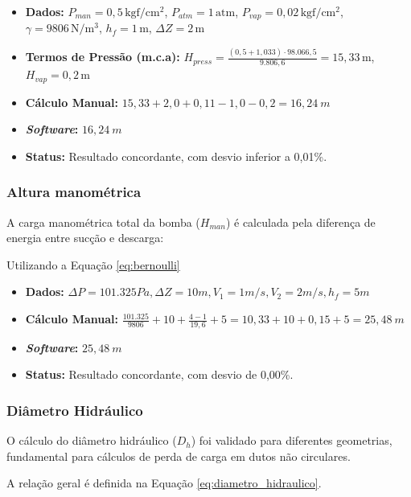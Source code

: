 \begin{itemize}
    \item \textbf{Dados:} $P_{man}=0{,}5\,\mathrm{kgf/cm^2}$, $P_{atm}=1\,\mathrm{atm}$, $P_{vap}=0{,}02\,\mathrm{kgf/cm^2}$, $\gamma=9806\,\mathrm{N/m^3}$, $h_f=1\,\mathrm{m}$, $\Delta Z=2\,\mathrm{m}$
    \item \textbf{Termos de Pressão (m.c.a):} $H_{press} = \frac{(0{,}5+1{,}033) \cdot 98.066{,}5}{9.806{,}6} = 15{,}33\,\mathrm{m}$, $H_{vap} = 0{,}2\,\mathrm{m}$
    \item \textbf{Cálculo Manual:} $15,33 + 2,0 + 0,11 - 1,0 - 0,2 = 16,24 \ m$
    \item \textbf{\textit{Software}:} $16,24 \ m$
    \item \textbf{Status:} Resultado concordante, com desvio inferior a 0,01\%.
\end{itemize}

\subsubsection{Altura manométrica}
A carga manométrica total da bomba ($H_{man}$) é calculada pela diferença de energia entre sucção e descarga:

\begin{center} Utilizando a Equação \ref{eq:bernoulli} \end{center}

\begin{itemize}
    \item \textbf{Dados:} $\Delta P=101.325 Pa, \Delta Z=10m, V_1=1m/s, V_2=2m/s, h_f=5m$
    \item \textbf{Cálculo Manual:} $\frac{101.325}{9806} + 10 + \frac{4-1}{19,6} + 5 = 10,33 + 10 + 0,15 + 5 = 25,48 \ m$
    \item \textbf{\textit{Software}:} $25,48 \ m$
    \item \textbf{Status:} Resultado concordante, com desvio de 0,00\%.
\end{itemize}

\subsubsection{Diâmetro Hidráulico}
O cálculo do diâmetro hidráulico ($D_h$) foi validado para diferentes geometrias, fundamental para cálculos de perda de carga em dutos não circulares.

A relação geral é definida na Equação \ref{eq:diametro_hidraulico}.


